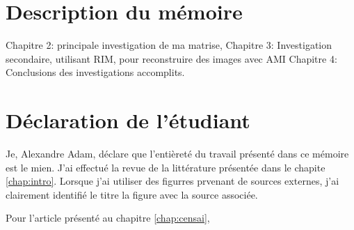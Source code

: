 

\section{Description du mémoire}

Chapitre 2: principale investigation de ma matrise,
Chapitre 3: Investigation secondaire, utilisant RIM, pour reconstruire des images avec AMI
Chapitre 4: Conclusions des investigations accomplits.

\section{Déclaration de l'étudiant}
Je, Alexandre Adam, déclare que l'entièreté du travail présenté dans ce mémoire est le mien. J'ai effectué la revue de 
la littérature présentée dans le chapite \ref{chap:intro}. Lorsque j'ai utiliser des figurres prvenant de sources externes, j'ai clairement 
identifié le titre la figure avec la source associée.

Pour l'article présenté au chapitre \ref{chap:censai}, 

